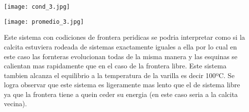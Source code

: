 \documentclass[12pt]{article}
\begin{document}
\begin{centering}
\captionsetup{type=figure}
\texttt{[image: cond\_3.jpg]}
\label{fig:cond_3}
\end{centering}


\begin{centering}
\captionsetup{type=figure}
\texttt{[image: promedio\_3.jpg]}
\label{fig:prom_3}
\end{centering}

\noindent Este sistema con codiciones de frontera peridicas se podria interpretar como si la calcita estuviera rodeada de sistemas exactamente iguales a ella por lo cual en este caso las fornteras evolucionan todas de la misma manera y las esquinas se calientan mas rapidamente que en el caso de la frontera libre. Este sistema tambien alcanza el equilibrio a la temperatura de la varilla es decir 100ºC. Se logra observar que este sistema es ligeramente mas lento que el de sistema libre ya que la frontera tiene a quein ceder su energia (en este caso seria a la calcita vecina).
 
\end{document}
